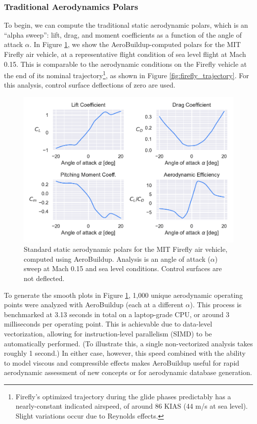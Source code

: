 \subsubsection{Traditional Aerodynamics Polars}

To begin, we can compute the traditional static aerodynamic polars, which is an ``alpha sweep'': lift, drag, and moment coefficients as a function of the angle of attack $\alpha$. In Figure \ref{fig:ab_polars}, we show the AeroBuildup-computed polars for the MIT Firefly air vehicle, at a representative flight condition of sea level flight at Mach 0.15. This is comparable to the aerodynamic conditions on the Firefly vehicle at the end of its nominal trajectory\footnote{Firefly's optimized trajectory during the glide phases predictably has a nearly-constant indicated airspeed, of around 86 KIAS (44 m/s at sea level). Slight variations occur due to Reynolds effects.}, as shown in Figure \ref{fig:firefly_trajectory}. For this analysis, control surface deflections of zero are used.

\begin{figure}[h]
    \centering
    \includegraphics[width=6in]{../figures/aerobuildup_figs/polars.pdf}
    \caption{Standard static aerodynamic polars for the MIT Firefly air vehicle, computed using AeroBuildup. Analysis is an angle of attack ($\alpha$) sweep at Mach 0.15 and sea level conditions. Control surfaces are not deflected.}
    \label{fig:ab_polars}
\end{figure}

To generate the smooth plots in Figure \ref{fig:ab_polars}, 1,000 unique aerodynamic operating points were analyzed with AeroBuildup (each at a different $\alpha$). This process is benchmarked at 3.13 seconds in total on a laptop-grade CPU, or around 3 milliseconds per operating point. This is achievable due to data-level vectorization, allowing for instruction-level parallelism (SIMD) to be automatically performed. (To illustrate this, a single non-vectorized analysis takes roughly 1 second.) In either case, however, this speed combined with the ability to model viscous and compressible effects makes AeroBuildup useful for rapid aerodynamic assessment of new concepts or for aerodynamic database generation.

